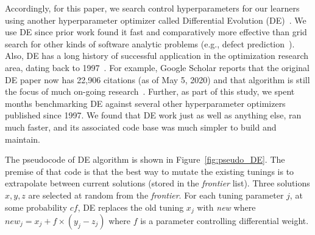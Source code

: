 \documentclass[sigconf,anonymous,review]{acmart}
\newcommand{\fig}[1]{Figure~\ref{fig:#1}}
\begin{document}
Accordingly, for this paper, we search control hyperparameters for our learners using  another hyperparameter optimizer called Differential Evolution (DE)~\cite{storn1997differential}.
We use DE since prior work found it fast and comparatively more effective than grid search for other kinds of software analytic problems (e.g., defect prediction~\cite{fu2016differential,Fu2016TuningFS}). Also, DE has a long history of successful application in the optimization research area, dating back to 1997~\cite{storn1997differential}. For example, Google Scholar reports that the original DE paper now has 22,906 citations (as of May 5, 2020) and that algorithm is still the focus of  much on-going research~\cite{das2010differential,wu2018ensemble,das2016recent}.  Further, as part of this study, we spent months benchmarking DE against several other hyperparameter optimizers published since 1997. We found that DE work just as well as anything else, ran much faster, and its associated code base was much simpler to build and maintain. 

 The pseudocode of DE algorithm is shown in \fig{pseudo_DE}. The premise of that code is that the best way to mutate the existing tunings is to extrapolate between current solutions (stored in the {\em frontier} list). Three solutions $x, y, z$ are selected at random from the {\em frontier}. For each tuning parameter $j$, at some probability $cf$, DE  replaces the old tuning $x_j$ with {\em new}  where
\mbox{$\mathit{new}_j = x_j + f \times (y_j - z_j)$}
where $f$ is a parameter controlling differential weight.  
\end{document}

